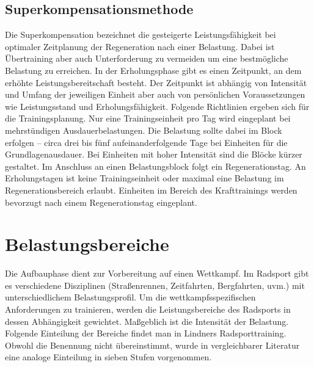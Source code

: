 \subsection{Superkompensationsmethode}
Die Superkompensation bezeichnet die gesteigerte Leistungsfähigkeit bei optimaler Zeitplanung der Regeneration nach einer Belastung.\cite[163]{Trainingswissenschaft} Dabei ist Übertraining aber auch Unterforderung zu vermeiden um eine bestmögliche Belastung zu erreichen. In der Erholungsphase gibt es einen Zeitpunkt, an dem erhöhte Leistungsbereitschaft besteht. Der Zeitpunkt ist abhängig von Intensität und Umfang der jeweiligen Einheit aber auch von persönlichen Voraussetzungen wie Leistungsstand und Erholungsfähigkeit. \newline
Folgende Richtlinien ergeben sich für die Trainingsplanung. \cite[44-46]{Radsporttraining} Nur eine Trainingseinheit pro Tag wird eingeplant bei mehrstündigen Ausdauerbelastungen. Die Belastung sollte dabei im Block erfolgen -- circa drei bis fünf aufeinanderfolgende Tage bei Einheiten für die Grundlagenausdauer. Bei Einheiten mit hoher Intensität sind die Blöcke kürzer gestaltet. Im Anschluss an einen Belastungsblock folgt ein Regenerationstag. An Erholungstagen ist keine Trainingseinheit oder maximal eine Belastung im Regenerationsbereich erlaubt. Einheiten im Bereich des Krafttrainings werden bevorzugt nach einem Regenerationstag eingeplant. 

\section{Belastungsbereiche}
\label{grundlagen:sport:belastungsbereiche}
Die Aufbauphase dient zur Vorbereitung auf einen Wettkampf. Im Radsport gibt es verschiedene Disziplinen (Straßenrennen, Zeitfahrten, Bergfahrten, uvm.) mit unterschiedlichem Belastungsprofil. Um die wettkampfsspezifischen Anforderungen zu trainieren, werden die Leistungsbereiche des Radsports in dessen Abhängigkeit gewichtet.  Maßgeblich ist die Intensität der Belastung. Folgende Einteilung der Bereiche findet man in Lindners Radsporttraining. \cite[31-39]{Radsporttraining} Obwohl die Benennung nicht übereinstimmt, wurde in vergleichbarer Literatur \cite[27]{Ausdauertrainer} eine analoge Einteilung in sieben Stufen vorgenommen.
